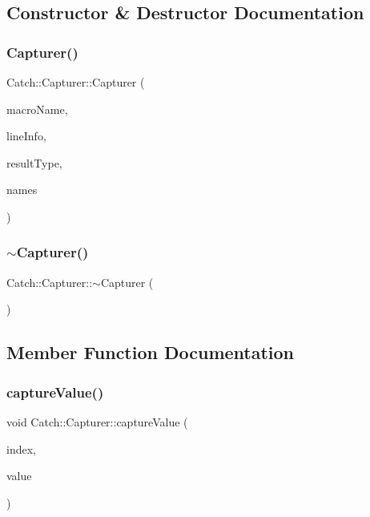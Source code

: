 \subsection{Constructor \& Destructor Documentation}
\mbox{\label{class_catch_1_1_capturer_a86b0b27acc803a4e1310c10820f3038f}} 
\subsubsection{Capturer()}
{\footnotesize\ttfamily Catch\+::\+Capturer\+::\+Capturer (\begin{DoxyParamCaption}\item[{\textbf{ String\+Ref}}]{macro\+Name,  }\item[{\textbf{ Source\+Line\+Info} const \&}]{line\+Info,  }\item[{\textbf{ Result\+Was\+::\+Of\+Type}}]{result\+Type,  }\item[{\textbf{ String\+Ref}}]{names }\end{DoxyParamCaption})}

\mbox{\label{class_catch_1_1_capturer_aecde85cf69e65565cec91e325a657b82}} 
\subsubsection{$\sim$Capturer()}
{\footnotesize\ttfamily Catch\+::\+Capturer\+::$\sim$\+Capturer (\begin{DoxyParamCaption}{ }\end{DoxyParamCaption})}



\subsection{Member Function Documentation}
\mbox{\label{class_catch_1_1_capturer_a0695ebf77f7cdcb344c73bcb3d9131e4}} 
\subsubsection{captureValue()}
{\footnotesize\ttfamily void Catch\+::\+Capturer\+::capture\+Value (\begin{DoxyParamCaption}\item[{size\+\_\+t}]{index,  }\item[{std\+::string const \&}]{value }\end{DoxyParamCaption})}


